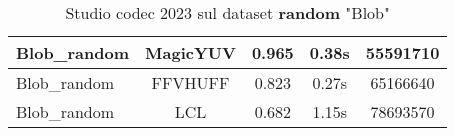 \begin{table}[ht]
\begin{tabular}{|l|c|c|c|c|}
Blob\_random          & MagicYUV  & 0.965                                                            & 0.38s                                                          & 55591710                                                     \\ \hline
Blob\_random          & FFVHUFF   & 0.823                                                            & 0.27s                                                          & 65166640                                                     \\ \hline
Blob\_random          & LCL       & 0.682                                                            & 1.15s                                                          & 78693570                                                     \\ \hline
\end{tabular}
\caption{Studio codec 2023 sul dataset \textbf{random} "Blob"}
\end{table}

